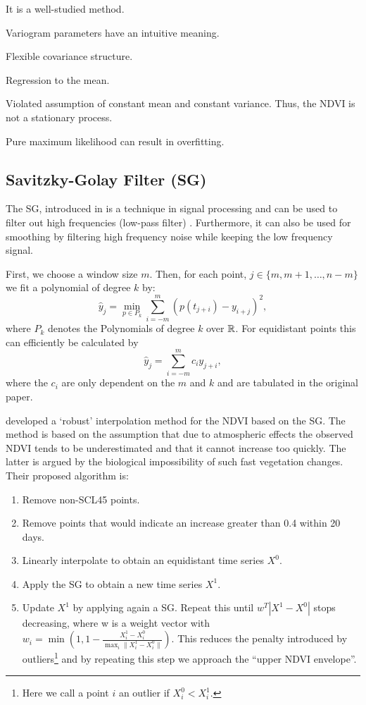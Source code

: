 		\begin{my_pros_cons_table}{
				\item It is a well-studied method.
				\item Variogram parameters have an intuitive meaning.
				\item Flexible covariance structure.
			}{
				\item Regression to the mean.
				\item Violated assumption of constant mean and constant variance. Thus, the NDVI is not a stationary process.
				\item Pure maximum likelihood can result in overfitting.
			}
		\end{my_pros_cons_table}


	\subsection{Savitzky-Golay Filter (SG)}
		\label{sec:Savitzky-Golay}
		The SG, introduced in \cite{savitzkySmoothingDifferentiationData1964} is a technique in signal processing and can be used to filter out high frequencies (low-pass filter) \citep{schaferWhatSavitzkyGolayFilter2011}. Furthermore, it can also be used for smoothing by filtering high frequency noise while keeping the low frequency signal.

		First, we choose a window size $m$. Then, for each point, $j \in \{m, m+1, \dots, n-m\}$ we fit a polynomial of degree $k$ by:
		$$\hat y_j=\min_{p\in P_k}\sum_{i=-m}^{m}(p (t_{j+i})-y_{i+j})^{2},$$
		where $P_k$ denotes the Polynomials of degree $k$ over $\mathbb{R}$.
		For equidistant points this can efficiently be calculated by
		$$
			\hat y_{j}=\sum_{i=-m}^{m} c_{i} y_{j+i},
		$$
		where the $c_i$ are only dependent on the $m$ and $k$ and are tabulated in the original paper.

		\cite{chenSimpleMethodReconstructing2004a} developed a `robust' interpolation method for the NDVI based on the SG. 
		The method is based on the assumption that due to atmospheric effects the observed NDVI tends to be underestimated and that it cannot increase too quickly. The latter is argued by the biological impossibility of such fast vegetation changes. Their proposed algorithm is:
			\begin{enumerate}
				\item Remove non-SCL45 points.
				\item Remove points that would indicate an increase greater than 0.4 within 20 days.
				\item Linearly interpolate to obtain an equidistant time series $X^0$.
				\item Apply the SG to obtain a new time series $X^1$.
				\item Update $X^1$ by applying again a SG. Repeat this until $w^T |X^1-X^0|$ stops decreasing, where w is a weight vector with $w_i = \min\left(1, 1 - \frac{X^1_i-X^0_i}{\max_i\|X^1_i-X^0_i\|}\right)$. This reduces the penalty introduced by outliers\footnote{Here we call a point $i$ an outlier if $X^0_i<X^1_i$.} and by repeating this step we approach the ``upper NDVI envelope''.
			\end{enumerate}

